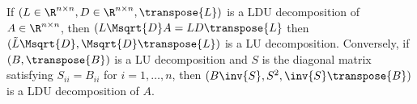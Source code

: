 If $(L \in \R^{n \times n}, D \in \R^{n \times n}, \transpose{L})$ is a LDU decomposition of $A \in \R^{n \times n}$, then $(L\Msqrt{D}A = LD\transpose{L}$ then $(\tilde{L}\Msqrt{D}, \Msqrt{D}\transpose{L})$ is a LU decomposition.
Conversely, if $(B, \transpose{B})$ is a LU decomposition and $S$ is the diagonal matrix satisfying $S_{ii} = B_{ii}$ for $i = 1, \dots, n$, then $(B\inv{S}, S^2, \inv{S}\transpose{B})$ is a LDU decomposition of $A$.



%
%
%

